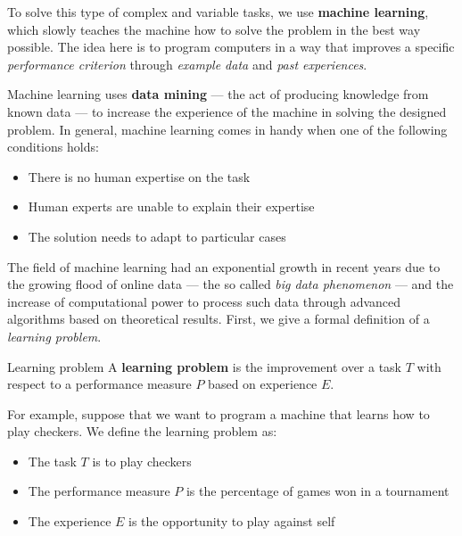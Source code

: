 \documentclass[a4paper, 12pt]{report}
\begin{document}
    To solve this type of complex and variable tasks, we use \textbf{machine learning}, which slowly teaches the machine how to solve the problem in the best way possible. The idea here is to program computers in a way that improves a specific \textit{performance criterion} through \textit{example data} and \textit{past experiences}.

    Machine learning uses \textbf{data mining} --- the act of producing knowledge from known data --- to increase the experience of the machine in solving the designed problem. In general, machine learning comes in handy when one of the following conditions holds:
    \begin{itemize}
        \item There is no human expertise on the task
        \item Human experts are unable to explain their expertise
        \item The solution needs to adapt to particular cases
    \end{itemize}

    The field of machine learning had an exponential growth in recent years due to the growing flood of online data --- the so called \textit{big data phenomenon} --- and the increase of computational power to process such data through advanced algorithms based on theoretical results. First, we give a formal definition of a \textit{learning problem}.

    \begin{frameddefn}{Learning problem}
        A \textbf{learning problem} is the improvement over a task $T$ with respect to a performance measure $P$ based on experience $E$.
    \end{frameddefn}

    For example, suppose that we want to program a machine that learns how to play checkers. We define the learning problem as:
    \begin{itemize}
        \item The task $T$ is to play checkers
        \item The performance measure $P$ is the percentage of games won in a tournament
        \item The experience $E$ is the opportunity to play against self
    \end{itemize}
\end{document}

